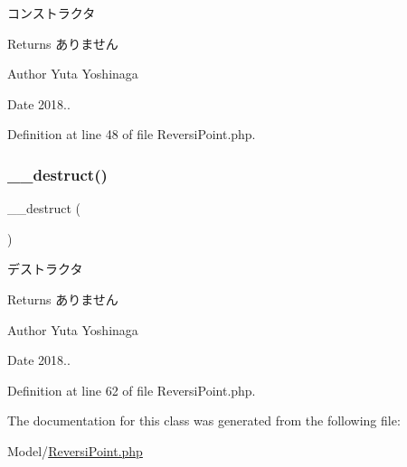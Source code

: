 コンストラクタ 

\begin{DoxyReturn}{Returns}
ありません 
\end{DoxyReturn}
\begin{DoxyAuthor}{Author}
Yuta Yoshinaga 
\end{DoxyAuthor}
\begin{DoxyDate}{Date}
2018.. 
\end{DoxyDate}


Definition at line 48 of file Reversi\+Point.\+php.

\mbox{\label{class_reversi_point_a421831a265621325e1fdd19aace0c758}} 
\subsubsection{\texorpdfstring{\+\_\+\+\_\+destruct()}{\_\_destruct()}}
{\footnotesize\ttfamily \+\_\+\+\_\+destruct (\begin{DoxyParamCaption}{ }\end{DoxyParamCaption})}



デストラクタ 

\begin{DoxyReturn}{Returns}
ありません 
\end{DoxyReturn}
\begin{DoxyAuthor}{Author}
Yuta Yoshinaga 
\end{DoxyAuthor}
\begin{DoxyDate}{Date}
2018.. 
\end{DoxyDate}


Definition at line 62 of file Reversi\+Point.\+php.



The documentation for this class was generated from the following file\+:\begin{DoxyCompactItemize}
\item 
Model/\hyperlink{_reversi_point_8php}{Reversi\+Point.\+php}\end{DoxyCompactItemize}
